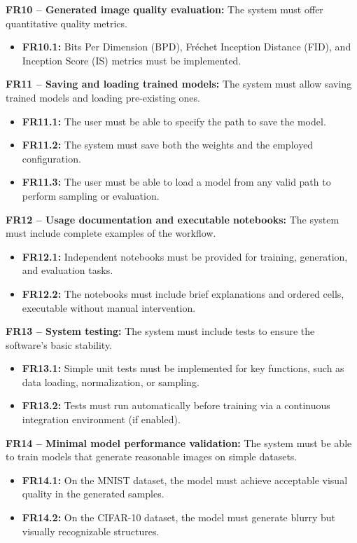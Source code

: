\documentclass[11pt,a4paper]{article}
\begin{document}
\textbf{FR10 – Generated image quality evaluation:} The system must offer quantitative quality metrics.
\begin{itemize}
    \item \textbf{FR10.1:} Bits Per Dimension (BPD), Fréchet Inception Distance (FID), and Inception Score (IS) metrics must be implemented.
\end{itemize}

\textbf{FR11 – Saving and loading trained models:} The system must allow saving trained models and loading pre-existing ones.
\begin{itemize}
    \item \textbf{FR11.1:} The user must be able to specify the path to save the model.
    \item \textbf{FR11.2:} The system must save both the weights and the employed configuration.
    \item \textbf{FR11.3:} The user must be able to load a model from any valid path to perform sampling or evaluation.
\end{itemize}

\textbf{FR12 – Usage documentation and executable notebooks:} The system must include complete examples of the workflow.
\begin{itemize}
    \item \textbf{FR12.1:} Independent notebooks must be provided for training, generation, and evaluation tasks.
    \item \textbf{FR12.2:} The notebooks must include brief explanations and ordered cells, executable without manual intervention.
\end{itemize}

\textbf{FR13 – System testing:} The system must include tests to ensure the software's basic stability.
\begin{itemize}
    \item \textbf{FR13.1:} Simple unit tests must be implemented for key functions, such as data loading, normalization, or sampling.
    \item \textbf{FR13.2:} Tests must run automatically before training via a continuous integration environment (if enabled).
\end{itemize}

\textbf{FR14 – Minimal model performance validation:} The system must be able to train models that generate reasonable images on simple datasets.
\begin{itemize}
    \item \textbf{FR14.1:} On the MNIST dataset, the model must achieve acceptable visual quality in the generated samples.
    \item \textbf{FR14.2:} On the CIFAR-10 dataset, the model must generate blurry but visually recognizable structures.
\end{itemize}
\end{document}
